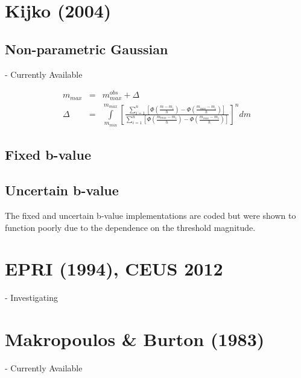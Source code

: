 \section{Kijko (2004)}

\subsection{Non-parametric Gaussian} - Currently Available

\begin{eqnarray}
m_{max} & = & m_{max}^{obs} + \Delta \\
\Delta  & = & \int\limits_{m_{min}}^{m_{max}} \left[ {\frac{\sum_{i = 1}^{n} \left[ {\Phi \left( {\frac{m - m_i}{h}} \right) - \Phi \left( {\frac{m_{min} - m_i}{h}} \right)} \right]}{\sum_{i = 1}^{n} \left[ {\Phi \left( {\frac{m_{max} - m_i}{h}} \right) - \Phi \left( {\frac{m_{min} - m_i}{h}} \right)} \right]}} \right]^n  dm
\end{eqnarray}

\subsection{Fixed b-value}

\subsection{Uncertain b-value}

The fixed and uncertain b-value implementations are coded but were shown to function poorly due to the dependence on the threshold magnitude.

\section{EPRI (1994), CEUS 2012} - Investigating

\section{Makropoulos \& Burton (1983)} - Currently Available
